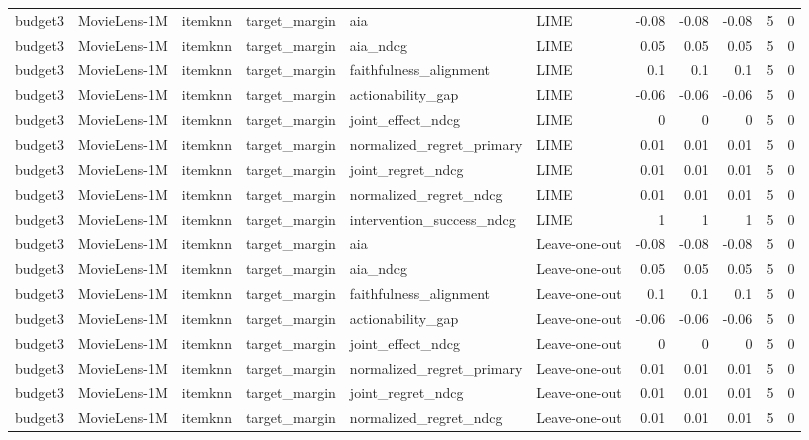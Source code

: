 \begin{table}[t]
{\begin{tabular}{llllllrrrrr}
budget3 & MovieLens-1M & itemknn & target\_margin & aia & LIME & -0.08 & -0.08 & -0.08 & 5 & 0 \\
budget3 & MovieLens-1M & itemknn & target\_margin & aia\_ndcg & LIME & 0.05 & 0.05 & 0.05 & 5 & 0 \\
budget3 & MovieLens-1M & itemknn & target\_margin & faithfulness\_alignment & LIME & 0.1 & 0.1 & 0.1 & 5 & 0 \\
budget3 & MovieLens-1M & itemknn & target\_margin & actionability\_gap & LIME & -0.06 & -0.06 & -0.06 & 5 & 0 \\
budget3 & MovieLens-1M & itemknn & target\_margin & joint\_effect\_ndcg & LIME & 0 & 0 & 0 & 5 & 0 \\
budget3 & MovieLens-1M & itemknn & target\_margin & normalized\_regret\_primary & LIME & 0.01 & 0.01 & 0.01 & 5 & 0 \\
budget3 & MovieLens-1M & itemknn & target\_margin & joint\_regret\_ndcg & LIME & 0.01 & 0.01 & 0.01 & 5 & 0 \\
budget3 & MovieLens-1M & itemknn & target\_margin & normalized\_regret\_ndcg & LIME & 0.01 & 0.01 & 0.01 & 5 & 0 \\
budget3 & MovieLens-1M & itemknn & target\_margin & intervention\_success\_ndcg & LIME & 1 & 1 & 1 & 5 & 0 \\
budget3 & MovieLens-1M & itemknn & target\_margin & aia & Leave-one-out & -0.08 & -0.08 & -0.08 & 5 & 0 \\
budget3 & MovieLens-1M & itemknn & target\_margin & aia\_ndcg & Leave-one-out & 0.05 & 0.05 & 0.05 & 5 & 0 \\
budget3 & MovieLens-1M & itemknn & target\_margin & faithfulness\_alignment & Leave-one-out & 0.1 & 0.1 & 0.1 & 5 & 0 \\
budget3 & MovieLens-1M & itemknn & target\_margin & actionability\_gap & Leave-one-out & -0.06 & -0.06 & -0.06 & 5 & 0 \\
budget3 & MovieLens-1M & itemknn & target\_margin & joint\_effect\_ndcg & Leave-one-out & 0 & 0 & 0 & 5 & 0 \\
budget3 & MovieLens-1M & itemknn & target\_margin & normalized\_regret\_primary & Leave-one-out & 0.01 & 0.01 & 0.01 & 5 & 0 \\
budget3 & MovieLens-1M & itemknn & target\_margin & joint\_regret\_ndcg & Leave-one-out & 0.01 & 0.01 & 0.01 & 5 & 0 \\
budget3 & MovieLens-1M & itemknn & target\_margin & normalized\_regret\_ndcg & Leave-one-out & 0.01 & 0.01 & 0.01 & 5 & 0 \\

\end{tabular}}
\end{table}
